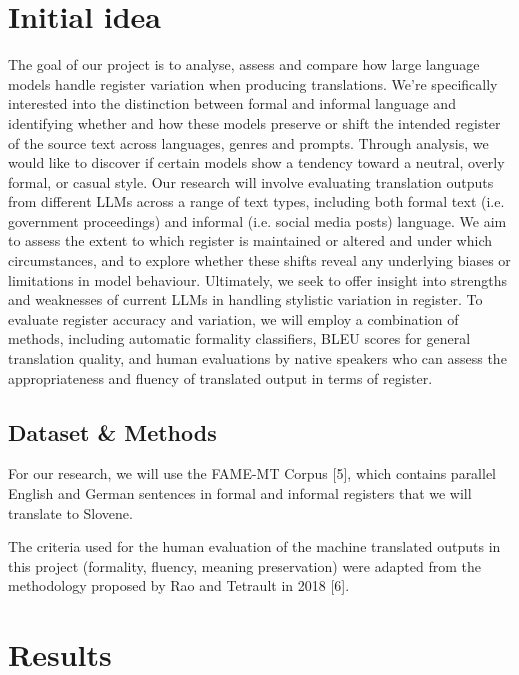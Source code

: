\documentclass[fleqn,moreauthors,10pt]{ds_report}
\begin{document}
	
	
	
	\section*{Initial idea}
	The goal of our project is to analyse, assess and compare how large language models handle register variation when producing translations. We’re specifically interested into the distinction between formal and informal language and identifying whether and how these models preserve or shift the intended register of the source text across languages, genres and prompts. Through analysis, we would like to discover if certain models show a tendency toward a neutral, overly formal, or casual style.
	Our research will involve evaluating translation outputs from different LLMs across a range of text types, including both formal text (i.e. government proceedings) and informal (i.e. social media posts) language. We aim to assess the extent to which register is maintained or altered and under which circumstances, and to explore whether these shifts reveal any underlying biases or limitations in model behaviour. Ultimately, we seek to offer insight into strengths and weaknesses of current LLMs in handling stylistic variation in register.
	To evaluate register accuracy and variation, we will employ a combination of methods, including automatic formality classifiers, BLEU scores for general translation quality, and human evaluations by native speakers who can assess the appropriateness and fluency of translated output in terms of register.
	
	
	\subsection*{Dataset \& Methods}
	
For our research, we will use the FAME-MT Corpus [5], which contains parallel English and German sentences in formal and informal registers that we will translate to Slovene.
 

The criteria used for the human evaluation of the machine translated outputs in this project (formality, fluency, meaning preservation) were adapted from the methodology proposed by Rao and Tetrault in 2018 [6].
	
	
		
		\section*{Results}
		
\end{document}
